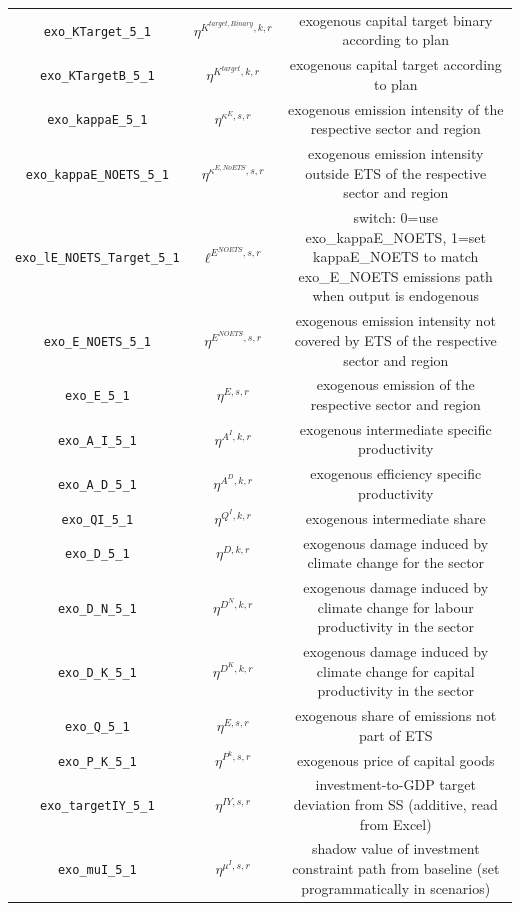 \begin{center}
\begin{longtable}{ccc}
\texttt{exo\_KTarget\_5\_1} & ${\eta^{K^{target,Binary},k,r}}$ & exogenous capital target binary according to plan\\
\texttt{exo\_KTargetB\_5\_1} & ${\eta^{K^{target},k,r}}$ & exogenous capital target according to plan\\
\texttt{exo\_kappaE\_5\_1} & ${\eta^{\kappa^{E},s,r}}$ & exogenous emission intensity of the respective sector and region\\
\texttt{exo\_kappaE\_NOETS\_5\_1} & ${\eta^{\kappa^{E,No ETS},s,r}}$ & exogenous emission intensity outside ETS of the respective sector and region\\
\texttt{exo\_lE\_NOETS\_Target\_5\_1} & ${\ell^{E^{NOETS},s,r}}$ & switch: 0=use exo\_kappaE\_NOETS, 1=set kappaE\_NOETS to match exo\_E\_NOETS emissions path when output is endogenous\\
\texttt{exo\_E\_NOETS\_5\_1} & ${\eta^{E^{NOETS},s,r}}$ & exogenous emission intensity not covered by ETS of the respective sector and region\\
\texttt{exo\_E\_5\_1} & ${\eta^{E,s,r}}$ & exogenous emission of the respective sector and region\\
\texttt{exo\_A\_I\_5\_1} & ${\eta^{A^{I},k,r}}$ & exogenous intermediate specific productivity\\
\texttt{exo\_A\_D\_5\_1} & ${\eta^{A^{D},k,r}}$ & exogenous efficiency specific productivity\\
\texttt{exo\_QI\_5\_1} & ${\eta^{Q^{I},k,r}}$ & exogenous intermediate share\\
\texttt{exo\_D\_5\_1} & ${\eta^{D,k,r}}$ & exogenous damage induced by climate change for the sector\\
\texttt{exo\_D\_N\_5\_1} & ${\eta^{D^{N},k,r}}$ & exogenous damage induced by climate change for labour productivity in the sector\\
\texttt{exo\_D\_K\_5\_1} & ${\eta^{D^{K},k,r}}$ & exogenous damage induced by climate change for capital productivity in the sector\\
\texttt{exo\_Q\_5\_1} & ${\eta^{E,s,r}}$ & exogenous share of emissions not part of ETS\\
\texttt{exo\_P\_K\_5\_1} & ${\eta^{P^k,s,r}}$ & exogenous price of capital goods\\
\texttt{exo\_targetIY\_5\_1} & ${\eta^{IY,s,r}}$ & investment-to-GDP target deviation from SS (additive, read from Excel)\\
\texttt{exo\_muI\_5\_1} & ${\eta^{\mu^{I},s,r}}$ & shadow value of investment constraint path from baseline (set programmatically in scenarios)\\

\end{longtable}
\end{center}
